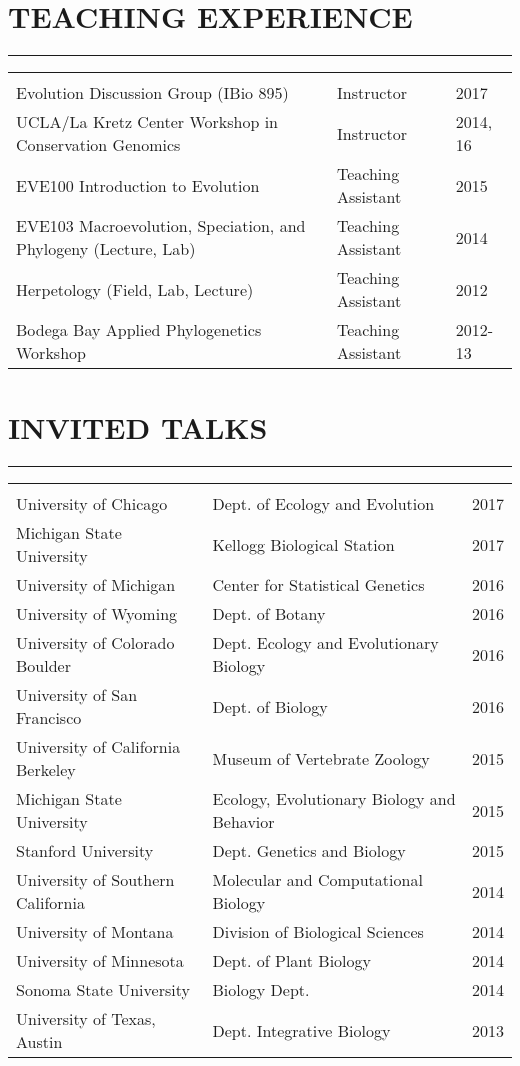\documentclass{article}
\begin{document}
\section*{TEACHING EXPERIENCE}
\vspace{-0.6cm}
\rule{470pt}{0.4pt}
%
\begin{tabular}{>{\everypar{\hangindent1cm}}p{}p{}p{}}
\hfill\\
Evolution Discussion Group (IBio 895) & Instructor & \hfill 2017 \\
UCLA/La Kretz Center Workshop in Conservation Genomics & Instructor & \hfill 2014, 16 \\
EVE100 Introduction to Evolution & Teaching Assistant & \hfill 2015	\\
EVE103 Macroevolution, Speciation, and Phylogeny (Lecture, Lab) & Teaching Assistant & \hfill 2014 \\
Herpetology (Field, Lab, Lecture) & Teaching Assistant & \hfill 2012\\
Bodega Bay Applied Phylogenetics Workshop & Teaching Assistant & \hfill 2012-13\\
\end{tabular}
%
%
\section*{INVITED TALKS}
\vspace{-0.6cm}
\rule{470pt}{0.4pt}
%
\begin{tabular}{>{\everypar{\hangindent1cm}}p{}p{}p{}}
\hfill\\
University of Chicago & Dept. of Ecology and Evolution & \hfill 2017 \\
%
Michigan State University & Kellogg Biological Station & \hfill 2017 \\
%
University of Michigan & Center for Statistical Genetics & \hfill 2016 \\
%
University of Wyoming & Dept. of Botany & \hfill 2016 \\
%
University of Colorado Boulder & Dept. Ecology and Evolutionary Biology & \hfill 2016 \\
%
University of San Francisco & Dept. of Biology & \hfill 2016 \\
%
University of California Berkeley & Museum of Vertebrate Zoology & \hfill 2015 \\
%
Michigan State University & Ecology, Evolutionary Biology and Behavior & \hfill 2015 \\
%
Stanford University & Dept. Genetics and Biology & \hfill 2015 \\
%
University of Southern California & Molecular and Computational Biology & \hfill 2014 \\
%
University of Montana & Division of Biological Sciences & \hfill 2014 \\
%
University of Minnesota & Dept. of Plant Biology & \hfill 2014 \\
%
Sonoma State University & Biology Dept. & \hfill 2014 \\
%
University of Texas, Austin & Dept. Integrative Biology & \hfill 2013 \\
%
\end{tabular}
%
\end{document}
